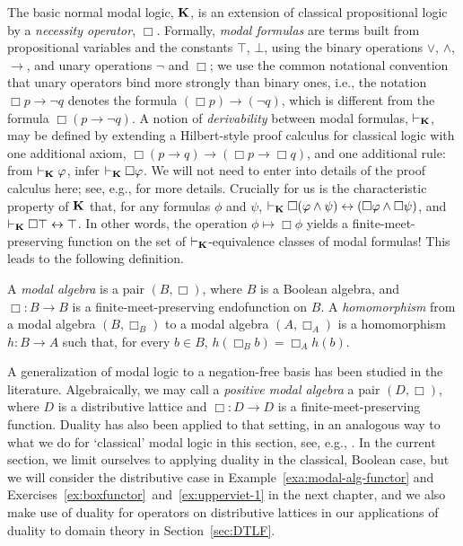 The basic normal modal logic, $\mathbf{K}$, is an extension of classical propositional logic by a \emph{necessity operator}, $\Box$. Formally, \emph{modal formulas} are terms built from propositional variables and the constants $\top$, $\bot$, using the binary operations $\vee$, $\wedge$, $\to$, and unary operations $\neg$ and $\Box$; we use the common notational convention that unary operators bind more strongly than binary ones, i.e., the notation $\Box p \to \neg q$ denotes the formula $(\Box p) \to (\neg q)$, which is different from the formula $\Box (p \to \neg q)$. A notion of \emph{derivability} between modal formulas, $\vdash_{\mathbf{K}}$, may be defined by extending a Hilbert-style proof calculus for classical logic with one additional axiom, $\Box(p \to q) \to (\Box p \to \Box q)$, and one additional rule: from $\vdash_{\mathbf{K}} \varphi$, infer $\vdash_{\mathbf{K}} \Box \varphi$. We will not need to enter into details of the proof calculus here; see, e.g., \cite[Sec.~3.6]{ChaZak1997} for more details. Crucially for us is the characteristic property of $\mathbf{K}$ that, for any formulas $\phi$ and $\psi$, $\vdash_{\mathbf{K}} \Box(\varphi \wedge \psi) \leftrightarrow (\Box \varphi \wedge \Box \psi)$, and $\vdash_{\mathbf{K}} \Box \top \leftrightarrow \top$. In other words, the operation $\phi \mapsto \Box \phi$ yields a finite-meet-preserving function on the set of $\vdash_{\mathbf{K}}$-equivalence classes of modal formulas! This leads to the following definition.
\begin{definition}\label{dfn:modal-algebra}
	A \emph{modal algebra} is a pair $(B, \Box)$, where $B$ is a Boolean algebra, and $\Box \colon B \to B$ is a finite-meet-preserving endofunction on $B$.
	A \emph{homomorphism} from a modal algebra $(B, \Box_B)$ to a modal algebra $(A, \Box_A)$ is a homomorphism $h \colon B \to A$ such that, for every $b \in B$, $h(\Box_B b) = \Box_A h(b)$.
\end{definition}
\begin{remark}\label{rem:pos-mod-alg}
  A generalization of modal logic to a negation-free basis has been studied in the literature. Algebraically, we may call a \emph{positive modal algebra} a pair $(D,\Box)$, where $D$ is a distributive lattice and $\Box \colon D \to D$ is a finite-meet-preserving function. Duality has also been applied to that setting, in an analogous way to what we do for `classical' modal logic in this section, see, e.g., \cite{CelJan99}. In the current section, we limit ourselves to applying duality in the classical, Boolean case, but we will consider the distributive case in Example~\ref{exa:modal-alg-functor} and Exercises~\ref{ex:boxfunctor}~and~\ref{ex:upperviet-1} in the next chapter, and we also make use of duality for operators on distributive lattices in our applications of duality to domain theory in Section~\ref{sec:DTLF}.
\end{remark}

